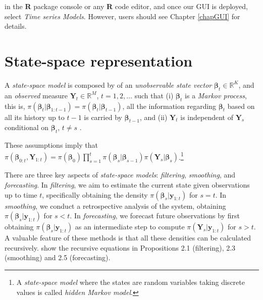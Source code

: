 in the \textbf{R} package console or any \textbf{R} code editor, and once our GUI is deployed, select \textit{Time series Models}. However, users should see Chapter \ref{chapGUI} for details.

\section{State-space representation}\label{sec81}
A \textit{state-space model} is composed by of an \textit{unobservable state vector}  $\bm{\beta}_t \in \mathbb{R}^K$, and an \textit{observed} measure $\bm{Y}_t \in \mathbb{R}^M$, $t=1,2,\dots$ such that (i) $\bm{\beta}_t$ is a \textit{Markov process}, this is, $\pi(\bm{\beta}_t|\bm{\beta}_{1:t-1})=\pi(\bm{\beta}_t|\bm{\beta}_{t-1})$, all the information regarding $\bm{\beta}_t$ based on all its history up to $t-1$ is carried by $\bm{\beta}_{t-1}$, and (ii) $\bm{Y}_t$ is independent of $\bm{Y}_s$ conditional on $\bm{\beta}_t$, $t\neq s$ \cite[Chap.~2]{petris2009dynamic}.

These assumptions imply that $\pi(\bm{\beta}_{0:t},\bm{Y}_{1:t})=\pi(\bm{\beta}_0)\prod_{s=1}^{t}\pi(\bm{\beta}_s|\bm{\beta}_{s-1})\pi(\bm{Y}_s|\bm{\beta}_s)$.\footnote{A \textit{state-space model} where the states are random variables taking discrete values is called \textit{hidden Markov model}.}

There are three key aspects of \textit{state-space models}: \textit{filtering}, \textit{smoothing}, and \textit{forecasting}. In \textit{filtering}, we aim to estimate the current state given observations up to time $t$, specifically obtaining the density $\pi(\bm{\beta}_{s}|\bm{y}_{1:t})$ for $s = t$. In \textit{smoothing}, we conduct a retrospective analysis of the system, obtaining $\pi(\bm{\beta}_{s}|\bm{y}_{1:t})$ for $s < t$. In \textit{forecasting}, we forecast future observations by first obtaining $\pi(\bm{\beta}_{s}|\bm{y}_{1:t})$ as an intermediate step to compute $\pi(\bm{Y}_{s}|\bm{y}_{1:t})$ for $s > t$. A valuable feature of these methods is that all these densities can be calculated recursively. \cite{petris2009dynamic} show the recursive equations in Propositions 2.1 (filtering), 2.3 (smoothing) and 2.5 (forecasting).

